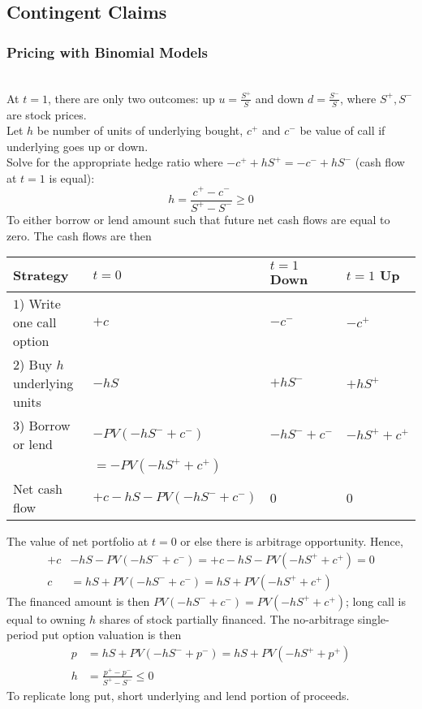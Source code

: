 \subsection{Contingent Claims}

\subsubsection{Pricing with Binomial Models}

\begin{remark} \\
At $t=1$, there are only two outcomes: up $u = \frac{S^+}{S}$ and down $d = \frac{S^-}{S}$, where $S^+, S^-$ are stock prices.\\
Let $h$ be number of units of underlying bought, $c^+$ and $c^-$ be value of call if underlying goes up or down.\\
Solve for the appropriate hedge ratio where $-c^+ + h S^+ = -c^- + hS^-$ (cash flow at $t=1$ is equal):
\begin{equation}
h = \frac{c^+ - c^-}{S^+ - S^-} \geq 0 \nonumber
\end{equation}
To either borrow or lend amount such that future net cash flows are  equal to zero. The cash flows are then\\
\begin{tabularx}{\textwidth}{p{14em}|p{14em}|X|X}
\hline
\rowcolor{gray!30}
Strategy & $t=0$ & $t=1$ Down & $t=1$ Up \\
\hline
$1$) Write one call option & $+c$ & $-c^-$ & $-c^+$ \\
$2$) Buy $h$ underlying units & $-hS$ & $+hS^-$ & $+hS^+$ \\
$3$) Borrow or lend & $-PV(-hS^- + c^-)$ & $-hS^- + c^-$ & $-hS^+ + c^+$ \\
& $= -PV(-hS^+ + c^+)$ & & \\
Net cash flow & $+c-hS - PV(-hS^- + c^-)$ & $0$ & $0$ \\
\hline
\end{tabularx}
The value of net portfolio at $t=0$ or else there is arbitrage opportunity. Hence,
\begin{align}
+c &-hS - PV(-hS^- + c^-) = +c-hS - PV(-hS^+ + c^+) = 0 \nonumber \\
c &= hS + PV(-hS^- + c^-) = hS + PV(-hS^+ + c^+)\nonumber
\end{align}
The financed amount is then $PV(-hS^- + c^-)=PV(-hS^+ + c^+)$; long call is equal to owning $h$ shares of stock partially financed. The no-arbitrage single-period put option valuation is then
\begin{align}
p &= hS + PV(-hS^- + p^-) = hS + PV(-hS^+ + p^+) \nonumber \\
h &= \frac{p^+ - p^-}{S^+ - S^-} \leq 0 \nonumber
\end{align}
To replicate long put, short underlying and lend portion of proceeds.
\end{remark}

